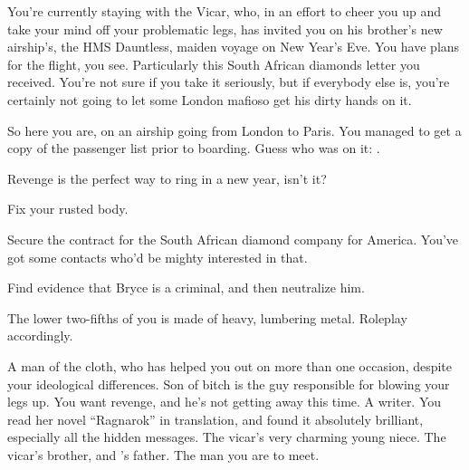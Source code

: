 \documentclass[char]{airship}
\begin{document}
You're currently staying with the Vicar, who, in an effort to cheer
you up and take your mind off your problematic legs, has invited you
on his brother's new airship's, the HMS Dauntless, maiden voyage on
New Year's Eve. You have plans for the flight, you see. Particularly this South African diamonds letter you received.
You're not sure if you take it seriously, but if everybody else is, you're certainly not going to let some London mafioso
get his dirty hands on it.

So
here you are, on an airship going from London to Paris.  You managed
to get a copy of the passenger list prior to boarding.  Guess who was
on it: {\cDealer{\intro}}.

Revenge is the perfect way to ring in a new year, isn't it?

\begin{itemz}[Goals]
  \item Fix your rusted body.
  \item Secure the contract for the South African diamond company for America.  You've got some contacts who'd be mighty interested in that.
  \item Find evidence that Bryce is a criminal, and then neutralize him.
\end{itemz}

\begin{itemz}[Notes]
  \item The lower two-fifths of you is made of heavy, lumbering metal. Roleplay accordingly.
\end{itemz}


\begin{contacts}
  \contact{\cVicar{}} A man of the cloth, who has helped you out on more than one occasion, despite your ideological differences.
  \contact{\cDealer{}} Son of bitch is the guy responsible for blowing your legs up.  You want revenge, and he's not getting away this time.
  \contact{\cSaboteur{}} A writer.  You read her novel ``Ragnarok'' in translation, and found it absolutely brilliant, especially all the hidden messages.
  \contact{\cThief{}} The vicar's very charming young niece.
  \contact{\cCaptain{}} The vicar's brother, and \cThief{}'s father.
  \contact{\cBoddy{}} The man you are to meet.
\end{contacts}
\end{document}
